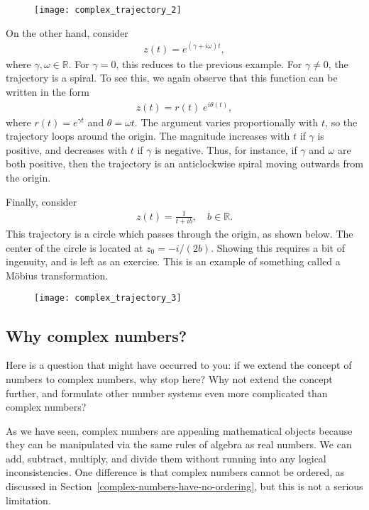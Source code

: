 \documentclass[10pt,a4paper]{article}
\begin{document}
\begin{figure}[ht]
  \centering\texttt{[image: complex\_trajectory\_2]}
\end{figure}

On the other hand, consider
\begin{align}
  z(t) = e^{(\gamma + i \omega) t},
\end{align}
where $\gamma,\omega \in \mathbb{R}.$ For $\gamma = 0$, this reduces
to the previous example.  For $\gamma \ne 0$, the trajectory is a
spiral.  To see this, we again observe that this function can be
written in the form
\begin{align}
  z(t) = r(t) \;e^{i\theta(t)},
\end{align}
where $r(t) = e^{\gamma t}$ and $\theta = \omega t.$ The argument
varies proportionally with $t$, so the trajectory loops around the
origin.  The magnitude increases with $t$ if $\gamma$ is positive, and
decreases with $t$ if $\gamma$ is negative. Thus, for instance, if
$\gamma$ and $\omega$ are both positive, then the trajectory is an
anticlockwise spiral moving outwards from the origin.

Finally, consider
\begin{align}
  z(t) = \frac{1}{t + ib}, \quad b \in \mathbb{R}.
\end{align}
This trajectory is a circle which passes through the origin, as shown
below.  The center of the circle is located at $z_0 =
-i/(2b)$. Showing this requires a bit of ingenuity, and is left as an
exercise.  This is an example of something called a M\"obius
transformation.

\begin{figure}[ht]
  \centering\texttt{[image: complex\_trajectory\_3]}
\end{figure}

\subsection{Why complex numbers?}\label{why-complex-numbers}

Here is a question that might have occurred to you: if we extend the
concept of numbers to complex numbers, why stop here? Why not extend
the concept further, and formulate other number systems even more
complicated than complex numbers?

As we have seen, complex numbers are appealing mathematical objects
because they can be manipulated via the same rules of algebra as real
numbers. We can add, subtract, multiply, and divide them without
running into any logical inconsistencies. One difference is that
complex numbers cannot be ordered, as discussed in
Section~\ref{complex-numbers-have-no-ordering}, but this is not a
serious limitation.
\end{document}
